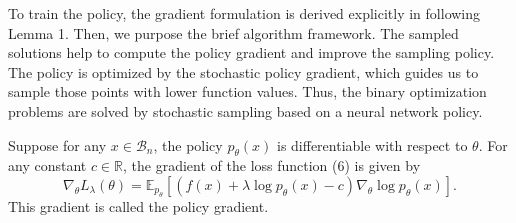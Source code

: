 To train the policy, the gradient formulation is derived explicitly in following Lemma 1. Then, we purpose the brief algorithm framework. The sampled solutions help to compute the policy gradient and improve the sampling policy. The policy is optimized by the stochastic policy gradient, which guides us to sample those points with lower function values. Thus, the binary optimization problems are solved by stochastic sampling based on a neural network policy. %

\begin{lemma}[Lemma 1]
    Suppose for any $x \in \mathcal{B}_{n}$, the policy $p_{\theta}(x)$ is differentiable with respect to $\theta$. For any constant $c \in \mathbb{R}$, the gradient of the loss function (6) is given by
\begin{equation}
    \nabla_{\theta} L_{\lambda}(\theta)=\mathbb{E}_{p_{\theta}}\left[\left(f(x)+\lambda \log p_{\theta}(x)-c\right) \nabla_{\theta} \log p_{\theta}(x)\right]. \tag{9}
\end{equation}
This gradient is called the policy gradient.
\end{lemma}
